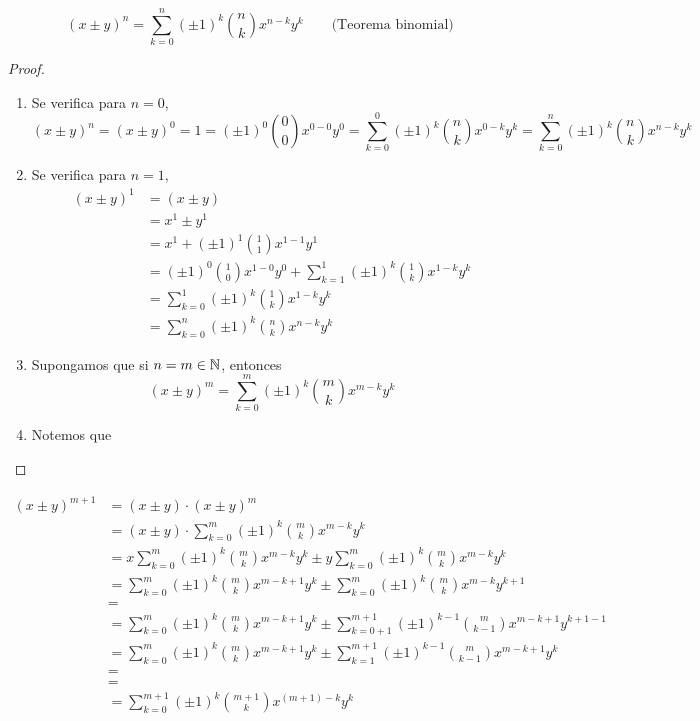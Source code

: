 \[(x\pm y)^n = \sum_{k=0}^{n} (\pm 1)^k \binom{n}{k} x^{n-k}y^k \qquad \text{(Teorema binomial)}\]

\begin{proof}\leavevmode
  
  \begin{enumerate}[label=\roman*)]
    \item Se verifica para $n=0$, \[(x\pm y)^n = (x\pm y)^0= 1= (\pm 1)^0 \binom{0}{0} x^{0-0}y^0= \sum_{k=0}^{0} (\pm 1)^k \binom{n}{k} x^{0-k}y^k= \sum_{k=0}^{n} (\pm 1)^k \binom{n}{k} x^{n-k}y^k\]
    \item Se verifica para $n=1$,
    \begin{align*}
      (x\pm y)^1 &= (x\pm y)\\
      &= x^1 \pm y^1\\
      &= x^1 + (\pm 1)^1 \binom{1}{1}x^{1-1}y^1\\
      &= (\pm 1)^0 \binom{1}{0} x^{1-0}y^0 + \sum_{k=1}^{1} (\pm 1)^k \binom{1}{k} x^{1-k}y^k\\
      &= \sum_{k=0}^{1} (\pm 1)^k \binom{1}{k} x^{1-k}y^k\\
      &= \sum_{k=0}^{n} (\pm 1)^k \binom{n}{k} x^{n-k}y^k
    \end{align*}
    \item Supongamos que si $n=m\in \mathbb{N}$, entonces \[(x\pm y)^m = \sum_{k=0}^{m} (\pm 1)^k \binom{m}{k} x^{m-k}y^k\]
    \item Notemos que 
  \end{enumerate}
\end{proof}

\begin{align*}
  (x\pm y)^{m+1} &= (x \pm y) \cdot (x \pm y)^m\\
  &= (x \pm y) \cdot \sum_{k=0}^{m} (\pm 1)^k \binom{m}{k} x^{m-k} y^k\\
  &=  x\sum_{k=0}^{m} (\pm 1)^k \binom{m}{k} x^{m-k}y^k \pm y \sum_{k=0}^{m} (\pm 1)^k \binom{m}{k} x^{m-k}y^k\\
  &= \sum_{k=0}^{m} (\pm 1)^k \binom{m}{k} x^{m-k+1}y^k \pm \sum_{k=0}^{m} (\pm 1)^k \binom{m}{k} x^{m-k}y^{k+1}\\
  &= \\
  &= \sum_{k=0}^{m} (\pm 1)^k \binom{m}{k} x^{m-k+1}y^k \pm \sum_{k=0+1}^{m+1} (\pm 1)^{k-1} \binom{m}{k-1} x^{m-k+1}y^{k+1-1}\\
  &= \sum_{k=0}^{m} (\pm 1)^k \binom{m}{k} x^{m-k+1}y^k \pm \sum_{k=1}^{m+1} (\pm 1)^{k-1} \binom{m}{k-1} x^{m-k+1}y^{k}\\
  &= \\
  &= \\
  &= \sum_{k=0}^{m+1} (\pm 1)^k \binom{m+1}{k} x^{(m+1)-k} y^k
  \end{align*}
  
